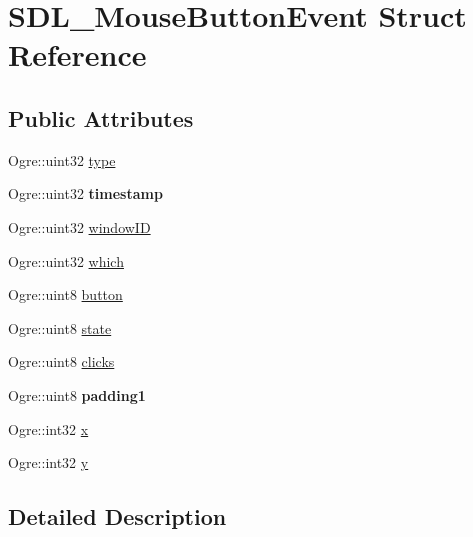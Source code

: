 \hypertarget{struct_s_d_l___mouse_button_event}{}\section{S\+D\+L\+\_\+\+Mouse\+Button\+Event Struct Reference}
\label{struct_s_d_l___mouse_button_event}
\subsection*{Public Attributes}
\begin{DoxyCompactItemize}
\item 
Ogre\+::uint32 \hyperlink{struct_s_d_l___mouse_button_event_a07300180f63abeecc56b0358525b096e}{type}
\item 
\mbox{\label{struct_s_d_l___mouse_button_event_a8fa7ed510a9dbe6fa8380ee2d3366e08}} 
Ogre\+::uint32 {\bfseries timestamp}
\item 
Ogre\+::uint32 \hyperlink{struct_s_d_l___mouse_button_event_a41a4397c3620630c895d6be7a17090bd}{window\+ID}
\item 
Ogre\+::uint32 \hyperlink{struct_s_d_l___mouse_button_event_af4fca7a7a624a906d9afae4316de199d}{which}
\item 
Ogre\+::uint8 \hyperlink{struct_s_d_l___mouse_button_event_ad6da062cd45b2482193e7faac482ca20}{button}
\item 
Ogre\+::uint8 \hyperlink{struct_s_d_l___mouse_button_event_a8d000517d2f23e7577e35bb8c0ef803a}{state}
\item 
Ogre\+::uint8 \hyperlink{struct_s_d_l___mouse_button_event_a35097491b084107fccb5cc014361d3d6}{clicks}
\item 
\mbox{\label{struct_s_d_l___mouse_button_event_a2b7ee1562f759ffcc415fb34c03a31a0}} 
Ogre\+::uint8 {\bfseries padding1}
\item 
Ogre\+::int32 \hyperlink{struct_s_d_l___mouse_button_event_aeb46064b59c44d7432356d9323e6c877}{x}
\item 
Ogre\+::int32 \hyperlink{struct_s_d_l___mouse_button_event_a811a7cc2e78a8740efed1bc6bb316819}{y}
\end{DoxyCompactItemize}


\subsection{Detailed Description}



